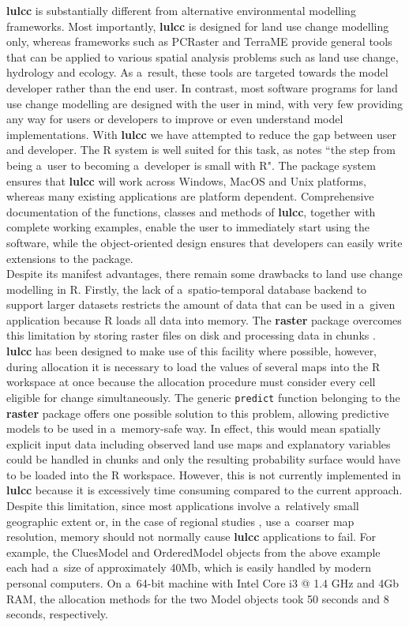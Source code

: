 \documentclass{icldt}\usepackage[]{graphicx}\usepackage[]{color}
\begin{document}
\textbf{lulcc} is substantially different from alternative environmental modelling frameworks. Most importantly, \textbf{lulcc} is designed for land use change modelling only, whereas frameworks such as PCRaster and TerraME provide general tools that can be applied to various spatial analysis problems such as land use change, hydrology and ecology. As a~result, these tools are targeted towards the model developer rather than the end user. In contrast, most software programs for land use change modelling are designed with the user in mind, with very few providing any way for users or developers to improve or even understand model implementations. With \textbf{lulcc} we have attempted to reduce the gap between user and developer. The R system is well suited for this task, as \citet{pebesma2012} notes ``the step from being a~user to becoming a~developer is small with R". The package system ensures that \textbf{lulcc} will work across Windows, MacOS and Unix platforms, whereas many existing applications are platform dependent. Comprehensive documentation of the functions, classes and methods of \textbf{lulcc}, together with complete working examples, enable the user to immediately start using the software, while the object-oriented design ensures that developers can easily write extensions to the package. \\

Despite its manifest advantages, there remain some drawbacks to land use change modelling in R. Firstly, the lack of a~spatio-temporal database backend to support larger datasets \citep{gebbert2014} restricts the amount of data that can be used in a~given application because R loads all data into memory. The \textbf{raster} package overcomes this limitation by storing raster files on disk and processing data in chunks \citep{hijmans2014}. \textbf{lulcc} has been designed to make use of this facility where possible, however, during allocation it is necessary to load the values of several maps into the R workspace at once because the allocation procedure must consider every cell eligible for change simultaneously. The generic \texttt{predict} function belonging to the \textbf{raster} package offers one possible solution to this problem, allowing predictive models to be used in a~memory-safe way. In effect, this would mean spatially explicit input data including observed land use maps and explanatory variables could be handled in chunks and only the resulting probability surface would have to be loaded into the R workspace. However, this is not currently implemented in \textbf{lulcc} because it is excessively time consuming compared to the current approach. Despite this limitation, since most applications involve a~relatively small geographic extent or, in the case of regional studies \citep[e.g.][]{verburg2009,fuchs2015}, use a~coarser map resolution, memory should not normally cause \textbf{lulcc} applications to fail. For example, the CluesModel and OrderedModel objects from the above example each had a~size of approximately 40Mb, which is easily handled by modern personal computers. On a~64-bit machine with Intel Core i3 @ 1.4 GHz and 4Gb RAM, the allocation methods for the two Model objects took 50 seconds and 8 seconds, respectively. \\
\end{document}
